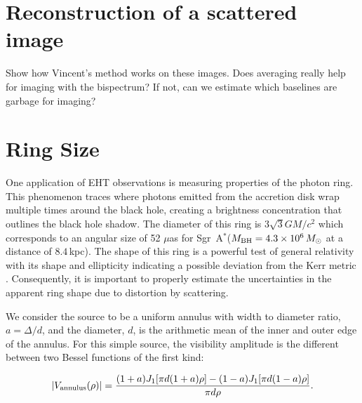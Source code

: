 \documentclass[11pt,preprint]{aastex}
\newcommand{\sgra}{Sgr~A$^{\ast}$}
\begin{document}
\section{Reconstruction of a scattered image}

Show how Vincent's method works on these images.  Does averaging really 
help for imaging with the bispectrum?  If not, can we estimate which baselines
are garbage for imaging?

\begin{figure}[t!]
\end{figure}

\section{Ring Size}

One application of EHT observations is measuring properties of 
the photon ring.  This phenomenon traces where photons emitted from the 
accretion disk wrap multiple times around the black hole, creating a brightness 
concentration that outlines the black hole shadow.  The diameter of this ring
is $3\sqrt{3}GM/c^2$ which corresponds to an angular size of 52 $\mu$as for 
\sgra ($M_{\rm BH} = 4.3\times10^6\,M_\odot$ at a distance of $8.4\,$kpc).  The 
shape of this ring is a powerful test of general relativity 
with its shape and ellipticity indicating a possible deviation from the Kerr 
metric \citep{johannsen10,johannsen15}.  Consequently, it is important to properly estimate the 
uncertainties in the apparent ring shape due to distortion by scattering.

We consider the source to be a uniform annulus with width to diameter
ratio, $a = \Delta/d$, and the diameter, $d$, is the arithmetic mean of the 
inner and outer edge of the annulus.  For this simple source, the visibility 
amplitude is the different between two Bessel functions of the first kind:

\begin{equation}
|V_{\rm annulus}(\rho)| = \frac{ (1+a) J_1[\pi d (1+a) \rho]- (1-a)J_1[\pi d(1-a)\rho] 
}{\pi d \rho}.
\label{eq:annulus_vis}
\end{equation}
\end{document}
